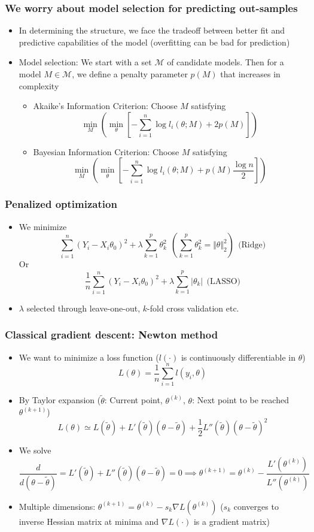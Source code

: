 \documentclass[aspectratio=169]{beamer}
\begin{document}
\begin{frame}
\frametitle{We worry about model selection for predicting out-samples}
\begin{itemize}
\item In determining the structure, we face the tradeoff between better fit and predictive capabilities of the model (overfitting can be bad for prediction)
\item Model selection: We start with a set $\mathcal{M}$ of candidate models. Then for a model $M\in\mathcal{M}$, we define a penalty parameter $p(M)$ that increases in complexity 
\begin{itemize}
\item Akaike's Information Criterion: Choose $M$ satisfying
\[
\min_{M}\left(\min_\theta\left[ -\sum_{i=1}^n \log{l_i(\theta;M)}+2p(M) \right]\right)
\]
\item Bayesian Information Criterion: Choose $M$ satisfying
\[
\min_{M}\left(\min_\theta\left[ -\sum_{i=1}^n \log{l_i(\theta;M)}+p(M)\frac{\log{n}}{2} \right]\right)
\]
\end{itemize}
\end{itemize}
\end{frame}

\begin{frame}
\frametitle{Penalized optimization}
\begin{itemize}
\item We minimize
\[
\sum_{i=1}^n(Y_i-X_i\theta_0)^2+\lambda\sum_{k=1}^p \theta_k^2 \ \ \left(\sum_{k=1}^p \theta_k^2=\Vert \theta\Vert_2^2\right) \ \ \text{(Ridge)}
\]
Or
\[
\frac{1}{n}\sum_{i=1}^n(Y_i-X_i\theta_0)^2+\lambda\sum_{k=1}^p |\theta_k|   \ \ \text{(LASSO)}
\] 
\item $\lambda$ selected through leave-one-out, $k$-fold cross validation etc. 
\end{itemize}
\end{frame}

\begin{frame}
\frametitle{Classical gradient descent: Newton method}
\begin{itemize}
\item We want to minimize a loss function ($l(\cdot)$ is continuously differentiable in $\theta$)
\[
L(\theta) = \frac{1}{n}\sum_{i=1}^n l(y_i,\theta)
\]
\item By Taylor expansion ($\tilde{\theta}$: Current point, $\theta^{(k)}$, $\theta$: Next point to be reached $\theta^{(k+1)}$)
\[
L(\theta) \simeq L(\tilde{\theta})+L'(\tilde{\theta})(\theta-\tilde{\theta})+\frac{1}{2}L''(\tilde{\theta})(\theta-\tilde{\theta})^2
\]
\item We solve
\[
\frac{d}{d(\theta-\tilde{\theta})} = L'(\tilde{\theta}) + L''(\tilde{\theta})(\theta-\tilde{\theta})=0 \implies  \theta^{(k+1)}= \theta^{(k)}-\frac{L'(\theta^{(k)})}{L''(\theta^{(k)})}
\]
\item Multiple dimensions: $\theta^{(k+1)}= \theta^{(k)}-s_k \nabla L(\theta^{(k)})$ ($s_k$ converges to inverse Hessian matrix at minima and $\nabla L(\cdot)$ is a gradient matrix)
\end{itemize}
\end{frame}
\end{document}
